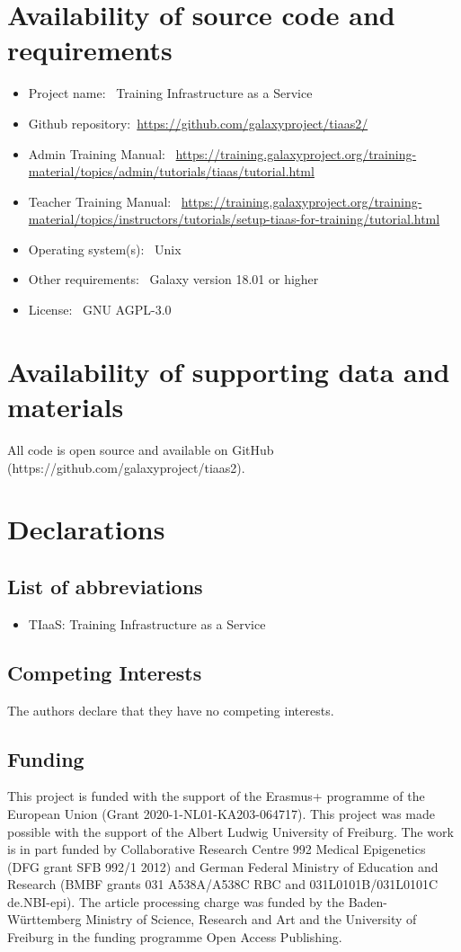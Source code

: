 \documentclass[a4paper,num-refs]{oup-contemporary}
\begin{document}
\section{Availability of source code and requirements}

\begin{itemize}
\item Project name: ~Training Infrastructure as a Service
\item Github repository:~\url{https://github.com/galaxyproject/tiaas2/}
\item Admin Training Manual: ~\url{https://training.galaxyproject.org/training-material/topics/admin/tutorials/tiaas/tutorial.html}
\item Teacher Training Manual: ~\url{https://training.galaxyproject.org/training-material/topics/instructors/tutorials/setup-tiaas-for-training/tutorial.html}
\item Operating system(s): ~Unix
\item Other requirements: ~Galaxy version 18.01 or higher
\item License: ~GNU AGPL-3.0
\end{itemize}

\section{Availability of supporting data and materials}
All code is open source and available on GitHub (https://github.com/galaxyproject/tiaas2).

\section{Declarations}

\subsection{List of abbreviations}
\begin{itemize}
\item TIaaS: Training Infrastructure as a Service
\end{itemize}


\subsection{Competing Interests}
The authors declare that they have no competing interests.

\subsection{Funding}
This project is funded with the support of the Erasmus+ programme of the European Union (Grant 2020-1-NL01-KA203-064717).
This project was made possible with the support of the Albert Ludwig University of Freiburg.
The work is in part funded by Collaborative Research Centre 992 Medical Epigenetics (DFG grant SFB 992/1 2012) and German Federal Ministry of Education and Research (BMBF grants 031 A538A/A538C RBC and 031L0101B/031L0101C de.NBI-epi). The article processing charge was funded by the Baden-Württemberg Ministry of Science, Research and Art and the University of Freiburg in the funding programme Open Access Publishing.
\end{document}
